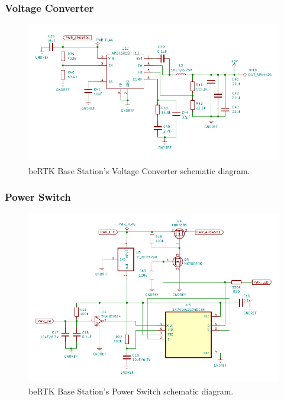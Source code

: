 \subsubsection{Voltage Converter}\label{sec:3213_AP64501}

\begin{figure}[h]
	\centering
	\includegraphics[width=1.0\textwidth]{Chapters/Figures/chapter3/Voltage_Converter.pdf}
	\caption{beRTK\textsuperscript{\textregistered} Base Station's Voltage Converter schematic diagram.}
	\label{fig:AP64501_circuit}
\end{figure}

\subsubsection{Power Switch}\label{sec:3214_SWITCH}

\begin{figure}[h]
	\centering
	\includegraphics[width=1.0\textwidth]{Chapters/Figures/chapter3/Power_Switch.pdf}
	\caption{beRTK\textsuperscript{\textregistered} Base Station's Power Switch schematic diagram.}
	\label{fig:SWITCH_circuit}
\end{figure}

